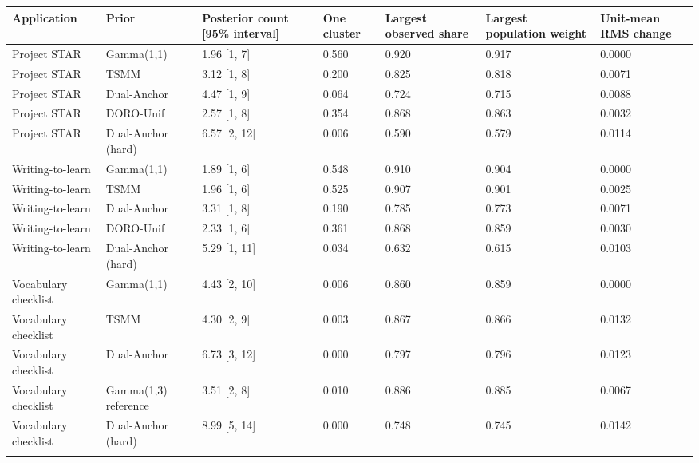 \begin{longtable}{lllllll}
\toprule
Application & Prior & Posterior count [95\% interval] & One cluster & Largest observed share & Largest population weight & Unit-mean RMS change \\
\midrule\endhead
Project STAR & Gamma(1,1) & 1.96 [1, 7] & 0.560 & 0.920 & 0.917 & 0.0000 \\ \addlinespace[3pt]
Project STAR & TSMM & 3.12 [1, 8] & 0.200 & 0.825 & 0.818 & 0.0071 \\ \addlinespace[3pt]
Project STAR & Dual-Anchor & 4.47 [1, 9] & 0.064 & 0.724 & 0.715 & 0.0088 \\ \addlinespace[3pt]
Project STAR & DORO-Unif & 2.57 [1, 8] & 0.354 & 0.868 & 0.863 & 0.0032 \\ \addlinespace[3pt]
Project STAR & Dual-Anchor (hard) & 6.57 [2, 12] & 0.006 & 0.590 & 0.579 & 0.0114 \\ \addlinespace[3pt]
Writing-to-learn & Gamma(1,1) & 1.89 [1, 6] & 0.548 & 0.910 & 0.904 & 0.0000 \\ \addlinespace[3pt]
Writing-to-learn & TSMM & 1.96 [1, 6] & 0.525 & 0.907 & 0.901 & 0.0025 \\ \addlinespace[3pt]
Writing-to-learn & Dual-Anchor & 3.31 [1, 8] & 0.190 & 0.785 & 0.773 & 0.0071 \\ \addlinespace[3pt]
Writing-to-learn & DORO-Unif & 2.33 [1, 6] & 0.361 & 0.868 & 0.859 & 0.0030 \\ \addlinespace[3pt]
Writing-to-learn & Dual-Anchor (hard) & 5.29 [1, 11] & 0.034 & 0.632 & 0.615 & 0.0103 \\ \addlinespace[3pt]
Vocabulary checklist & Gamma(1,1) & 4.43 [2, 10] & 0.006 & 0.860 & 0.859 & 0.0000 \\ \addlinespace[3pt]
Vocabulary checklist & TSMM & 4.30 [2, 9] & 0.003 & 0.867 & 0.866 & 0.0132 \\ \addlinespace[3pt]
Vocabulary checklist & Dual-Anchor & 6.73 [3, 12] & 0.000 & 0.797 & 0.796 & 0.0123 \\ \addlinespace[3pt]
Vocabulary checklist & Gamma(1,3) reference & 3.51 [2, 8] & 0.010 & 0.886 & 0.885 & 0.0067 \\ \addlinespace[3pt]
Vocabulary checklist & Dual-Anchor (hard) & 8.99 [5, 14] & 0.000 & 0.748 & 0.745 & 0.0142 \\ \addlinespace[3pt]
\bottomrule\end{longtable}
